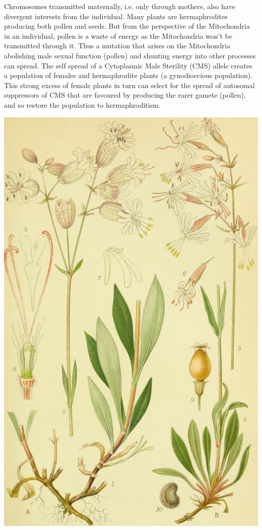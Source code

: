 {Chromosomes transmitted maternally, i.e. only through mothers, also have divergent
interests from the individual. Many plants are hermaphrodites producing
both pollen and seeds. But from the perspective of the Mitochondria in
an individual, pollen is a waste of energy as the Mitochondria won't
be transmitted through it. Thus a mutation that arises on the
Mitochondria abolishing male sexual function (pollen) and shunting energy into
other processes can spread. 
The self spread of a Cytoplasmic Male
Sterility (CMS) allele creates a population
of females and hermaphrodite plants (a gynodioecious population).
This strong excess of female plants in
turn can select for the spread of autosomal suppressors of CMS that are
favoured by producing the rarer gamete (pollen), and so restore the
population to hermaphroditism.   \begin{marginfigure}
\begin{center}
\includegraphics[width= \textwidth]{illustration_images/single_locus_selection/Silene_vulgaris/20184393949_9e22db5ff4_k.jpg}

\end{center}
\end{marginfigure}}
